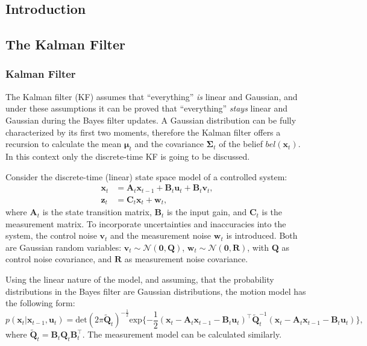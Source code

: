 \subsection{Introduction}
\subsection{The Kalman Filter}
\subsubsection{Kalman Filter}
The Kalman filter (KF) assumes that ``everything'' \emph{is} linear and Gaussian,
and under these assumptions it can be proved that ``everything'' \emph{stays} linear and Gaussian during the Bayes filter updates.
A Gaussian distribution can be fully characterized by its first two moments,
therefore the Kalman filter offers a recursion to calculate the mean $\boldsymbol{\mu}_t$ and the covariance $\mathbf{\Sigma}_t$ of the belief $bel(\mathbf{x}_t)$.
In this context only the discrete-time KF is going to be discussed.

Consider the discrete-time (linear) state space model of a controlled system:
\begin{align}
    \mathbf{x}_t & = \mathbf{A}_t\mathbf{x}_{t-1} + \mathbf{B}_t\mathbf{u}_t + \mathbf{B}_t\mathbf{v}_t, \\
    \mathbf{z}_t & = \mathbf{C}_t\mathbf{x}_t + \mathbf{w}_t, \label{eq:lin-meas-model}
\end{align}
where $\mathbf{A}_t$ is the state transition matrix, $\mathbf{B}_t$ is the input gain, and $\mathbf{C}_t$ is the measurement matrix. To incorporate uncertainties and inaccuracies into the system,
the control noise $\mathbf{v}_t$ and the measurement noise $\mathbf{w}_t$ is introduced.
Both are Gaussian random variables:
$\mathbf{v}_t \sim \mathcal{N}(\mathbf{0},\mathbf{Q})$, $\mathbf{w}_t \sim \mathcal{N}(\mathbf{0},\mathbf{R})$,
with $\mathbf{Q}$ as control noise covariance, and $\mathbf{R}$ as measurement noise covariance.

Using the linear nature of the model, and assuming, that the probability distributions in the Bayes filter are Gaussian distributions, the motion model has the following form:
\begin{equation}\label{key}
    p(\mathbf{x}_t|\mathbf{x}_{t-1}, \mathbf{u}_t) = \mathrm{det}(2\pi\tilde{\mathbf{Q}}_t)
    ^{-\frac{1}{2}}\mathrm{exp}\{-\frac{1}{2}(\mathbf{x}_t-\mathbf{A}_t\mathbf{x}_{t-1}-
    \mathbf{B}_t\mathbf{u}_t)^\top\tilde{\mathbf{Q}}_t^{-1}(\mathbf{x}_t-\mathbf{A}_t\mathbf{x}_{t-1}-\mathbf{B}_t\mathbf{u}_t)\},
\end{equation}
where $\tilde{\mathbf{Q}}_t = \mathbf{B}_t\mathbf{Q}_t\mathbf{B}_t^{\top}$.
The measurement model can be calculated similarly.

